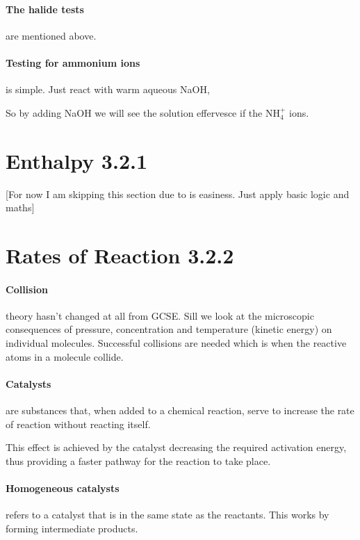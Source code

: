 \documentclass[11pt,a4paper]{memoir}
\begin{document}
	\paragraph{The halide tests} are mentioned above.
	
	\paragraph{Testing for ammonium ions} is simple. Just react with warm aqueous NaOH,
	\begin{center}
	\end{center}
	So by adding NaOH we will see the solution effervesce if the NH$_4^+$ ions.
	
\section{Enthalpy 3.2.1}
[For now I am skipping this section due to is easiness. Just apply basic logic and maths]

\section{Rates of Reaction 3.2.2}
	\paragraph{Collision} theory hasn't changed at all from GCSE. Sill we look at the microscopic consequences of pressure, concentration and temperature (kinetic energy) on individual molecules. Successful collisions are needed which is when the reactive atoms in a molecule collide.
	
	\paragraph{Catalysts} are substances that, when added to a chemical reaction, serve to increase the rate of reaction without reacting itself.
	
	This effect is achieved by the catalyst decreasing the required activation energy, thus providing a faster pathway for the reaction to take place.
	
	\paragraph{Homogeneous catalysts} refers to a catalyst that is in the same state as the reactants. This works by forming intermediate products.
	
\end{document}
